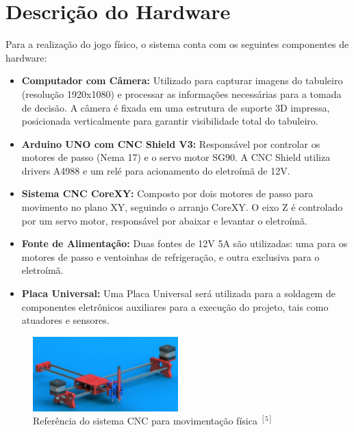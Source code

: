 \documentclass[a4paper,12pt]{article}
\begin{document}
\section{Descrição do Hardware}  
Para a realização do jogo físico, o sistema conta com os seguintes componentes de hardware:  
\begin{itemize}  
    \item \textbf{Computador com Câmera:} Utilizado para capturar imagens do tabuleiro (resolução 1920x1080) e processar as informações necessárias para a tomada de decisão. A câmera é fixada em uma estrutura de suporte 3D impressa, posicionada verticalmente para garantir visibilidade total do tabuleiro.  
    \item \textbf{Arduino UNO com CNC Shield V3:} Responsável por controlar os motores de passo (Nema 17) e o servo motor SG90. A CNC Shield utiliza drivers A4988 e um relé para acionamento do eletroímã de 12V.  
    \item \textbf{Sistema CNC CoreXY:} Composto por dois motores de passo para movimento no plano XY, seguindo o arranjo CoreXY. O eixo Z é controlado por um servo motor, responsável por abaixar e levantar o eletroímã.  
    \item \textbf{Fonte de Alimentação:} Duas fontes de 12V 5A são utilizadas: uma para os motores de passo e ventoinhas de refrigeração, e outra exclusiva para o eletroímã.  
	\item \textbf{Placa Universal:} Uma Placa Universal será utilizada para a soldagem de componentes eletrônicos auxiliares para a execução do projeto, tais como atuadores e sensores.
\end{itemize}  

\begin{figure}[H]  
    \centering  
    \includegraphics[width=0.5\textwidth]{images/drawingbot.png}   
    \caption{Referência do sistema CNC para movimentação física $^{[5]}$}  
    \label{fig:modelo_cnc}  
\end{figure}  

\end{document}
